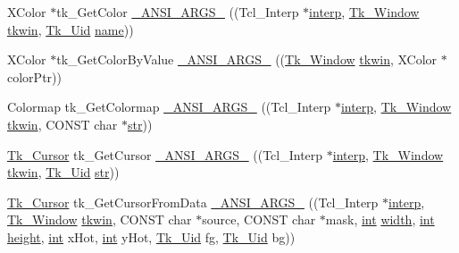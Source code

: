 \begin{DoxyCompactItemize}
\item 
X\+Color $\ast$tk\+\_\+\+Get\+Color \hyperlink{struct_tk_stubs_a7226dbcce86cc330d802e2989566788c}{\+\_\+\+A\+N\+S\+I\+\_\+\+A\+R\+G\+S\+\_\+} ((Tcl\+\_\+\+Interp $\ast$\hyperlink{tk_8h_a5ab79c0f5849ee8e6a2e955a6c536cc0}{interp}, \hyperlink{tk_8h_ab756137de3ee74edc2501bd0d761e37c}{Tk\+\_\+\+Window} \hyperlink{tk_8h_a35df722e7e1b6efd651683b8be7c1490}{tkwin}, \hyperlink{tk_8h_aab6f7e0c4f113c8e02feee260e7c4414}{Tk\+\_\+\+Uid} \hyperlink{tk_8h_a2946c588fc7fa2fa5b43ac54b7872725}{name}))
\item 
X\+Color $\ast$tk\+\_\+\+Get\+Color\+By\+Value \hyperlink{struct_tk_stubs_a15974db6e8a5a4a6d6d58fd60ed5b20c}{\+\_\+\+A\+N\+S\+I\+\_\+\+A\+R\+G\+S\+\_\+} ((\hyperlink{tk_8h_ab756137de3ee74edc2501bd0d761e37c}{Tk\+\_\+\+Window} \hyperlink{tk_8h_a35df722e7e1b6efd651683b8be7c1490}{tkwin}, X\+Color $\ast$color\+Ptr))
\item 
Colormap tk\+\_\+\+Get\+Colormap \hyperlink{struct_tk_stubs_a04afa1fdc932832234cd68ccd973d2f0}{\+\_\+\+A\+N\+S\+I\+\_\+\+A\+R\+G\+S\+\_\+} ((Tcl\+\_\+\+Interp $\ast$\hyperlink{tk_8h_a5ab79c0f5849ee8e6a2e955a6c536cc0}{interp}, \hyperlink{tk_8h_ab756137de3ee74edc2501bd0d761e37c}{Tk\+\_\+\+Window} \hyperlink{tk_8h_a35df722e7e1b6efd651683b8be7c1490}{tkwin}, C\+O\+N\+ST char $\ast$\hyperlink{morph_8c_ab50d783982593ef993ea0b68f7ad8b80}{str}))
\item 
\hyperlink{tk_8h_a9505b763a290e218b96e0e83fc275691}{Tk\+\_\+\+Cursor} tk\+\_\+\+Get\+Cursor \hyperlink{struct_tk_stubs_a08ab6ac5aad2d92525fdf68dcb9f625f}{\+\_\+\+A\+N\+S\+I\+\_\+\+A\+R\+G\+S\+\_\+} ((Tcl\+\_\+\+Interp $\ast$\hyperlink{tk_8h_a5ab79c0f5849ee8e6a2e955a6c536cc0}{interp}, \hyperlink{tk_8h_ab756137de3ee74edc2501bd0d761e37c}{Tk\+\_\+\+Window} \hyperlink{tk_8h_a35df722e7e1b6efd651683b8be7c1490}{tkwin}, \hyperlink{tk_8h_aab6f7e0c4f113c8e02feee260e7c4414}{Tk\+\_\+\+Uid} \hyperlink{morph_8c_ab50d783982593ef993ea0b68f7ad8b80}{str}))
\item 
\hyperlink{tk_8h_a9505b763a290e218b96e0e83fc275691}{Tk\+\_\+\+Cursor} tk\+\_\+\+Get\+Cursor\+From\+Data \hyperlink{struct_tk_stubs_a1f1350bdc9f4d98ceb16ee2b8118f760}{\+\_\+\+A\+N\+S\+I\+\_\+\+A\+R\+G\+S\+\_\+} ((Tcl\+\_\+\+Interp $\ast$\hyperlink{tk_8h_a5ab79c0f5849ee8e6a2e955a6c536cc0}{interp}, \hyperlink{tk_8h_ab756137de3ee74edc2501bd0d761e37c}{Tk\+\_\+\+Window} \hyperlink{tk_8h_a35df722e7e1b6efd651683b8be7c1490}{tkwin}, C\+O\+N\+ST char $\ast$source, C\+O\+N\+ST char $\ast$mask, \hyperlink{tk_8h_a83f82f76e7fed06f4c49d2db94028a6d}{int} \hyperlink{tk_8h_a29e50a5401c1396b3a2aa3487f74d468}{width}, \hyperlink{tk_8h_a83f82f76e7fed06f4c49d2db94028a6d}{int} \hyperlink{tk_8h_a67be2f4b9d9c5b3559139bfb072e2e81}{height}, \hyperlink{tk_8h_a83f82f76e7fed06f4c49d2db94028a6d}{int} x\+Hot, \hyperlink{tk_8h_a83f82f76e7fed06f4c49d2db94028a6d}{int} y\+Hot, \hyperlink{tk_8h_aab6f7e0c4f113c8e02feee260e7c4414}{Tk\+\_\+\+Uid} fg, \hyperlink{tk_8h_aab6f7e0c4f113c8e02feee260e7c4414}{Tk\+\_\+\+Uid} bg))

\end{DoxyCompactItemize}
